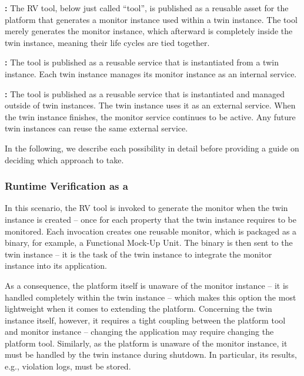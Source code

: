 \textbf{\methodone:} The RV tool, below just called ``tool'', is published as a reusable asset for the platform that generates a monitor instance used within a twin instance. The tool merely generates the monitor instance, which afterward is completely inside the twin instance, meaning their life cycles are tied together.

\textbf{\methodtwo:} The tool is published as a reusable service that is instantiated from a twin instance.
Each twin instance manages its monitor instance as an internal service.

\textbf{\methodthree:} The tool is published as a reusable service that is instantiated and managed outside of twin instances.
The twin instance uses it as an external service.
When the twin instance finishes, the monitor service continues to be active. Any future twin instances can reuse the same external service.

In the following, we describe each possibility in detail before providing a guide on deciding which approach to take.

\subsubsection{Runtime Verification as a \methodone}
In this scenario, the RV tool is invoked to generate the monitor when the twin instance is created -- once for each property that the twin instance requires to be monitored.
Each invocation creates one reusable monitor, which is packaged as a binary, for example, a Functional Mock-Up Unit.
The binary is then sent to the twin instance -- it is the task of the twin instance to integrate the monitor instance into its application.

As a consequence, the platform itself is unaware of the monitor instance -- it is handled completely within the twin instance -- which makes this option the most lightweight when it comes
to extending the platform. Concerning the twin instance itself, however, it requires a tight coupling between the platform tool and monitor instance --
changing the application may require changing the platform tool.
Similarly, as the platform is unaware of the monitor instance, it must be handled by the twin instance during shutdown.
In particular, its results, e.g., violation logs, must be stored.

